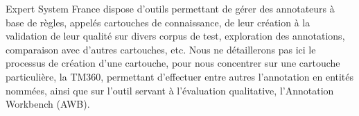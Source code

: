 \documentclass[PhD-Yoann-Dupont.tex]{subfiles}
\begin{document}
Expert System France dispose d'outils permettant de gérer des annotateurs à base de règles, appelés cartouches de connaissance, de leur création à la validation de leur qualité sur divers corpus de test, exploration des annotations, comparaison avec d'autres cartouches, etc. Nous ne détaillerons pas ici le processus de création d'une cartouche, pour nous concentrer sur une cartouche particulière, la TM360, permettant d'effectuer entre autres l'annotation en entités nommées, ainsi que sur l'outil servant à l'évaluation qualitative, l'Annotation Workbench (AWB).
\end{document}
